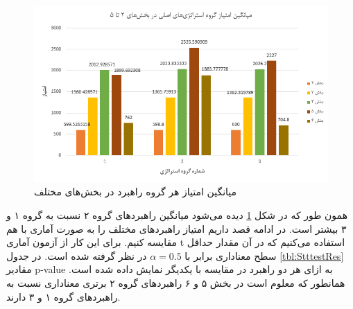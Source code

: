 \documentclass[twoside, a4paper,11pt]{book}
\numberwithin{equation}{chapter}
\numberwithin{table}{chapter}
\numberwithin{figure}{chapter}
\numberwithin{equation}{chapter}
\begin{document}
\begin{figure}
\centering
\includegraphics[scale=0.8]{Figures/part2-5AvgScores.png}
\caption{\label{fig:part2to5avgscores}
میانگین امتیاز هر گروه راهبرد در بخش‌های مختلف
}
\end{figure}




همون طور که در شکل \ref{fig:part2to5avgscores} دیده می‌شود میانگین راهبردهای گروه ۲ نسبت به گروه ۱ و ۳ بیشتر است. در ادامه قصد داریم امتیاز راهبردهای مختلف را به صورت آماری با هم مقایسه کنیم. برای این کار از آزمون آماری t  استفاده می‌کنیم که در آن مقدار حداقل سطح معناداری برابر با  $\alpha = 0.5$ در نظر گرفته شده است. در جدول \ref{tbl:StttestRes} مقادیر p-value به ازای هر دو راهبرد در مقایسه با یکدیگر نمایش داده شده است. همانطور که معلوم است در بخش ۵ و ۶ راهبردهای گروه ۲ برتری معناداری نسبت به راهبردهای گروه ۱ و ۳ دارند.
\end{document}
